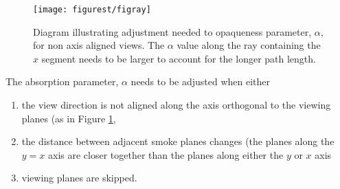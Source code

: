 \begin{figure}[t]
\centerline{\texttt{[image: figurest/figray]}}
\caption [Diagram illustrating the adjustment needed to opaqueness
parameter, $\alpha$, for non axis aligned views.] { Diagram
illustrating adjustment needed to opaqueness parameter, $\alpha$,
for non axis aligned views. The $\alpha$ value along the ray
containing the $\hat{x}$ segment needs to be larger to account for
the longer path length. } \label{figray}
\end{figure}
The absorption parameter, $\alpha$ needs to be adjusted when
either
\begin{enumerate}
\item the view direction is not aligned along the axis orthogonal
to the viewing planes (as in Figure \ref{figray}, \item the
distance between adjacent smoke planes changes (the planes along
the $y=x$ axis are closer together than the planes along either
the $y$ or $x$ axis \item viewing planes are skipped.
\end{enumerate}

